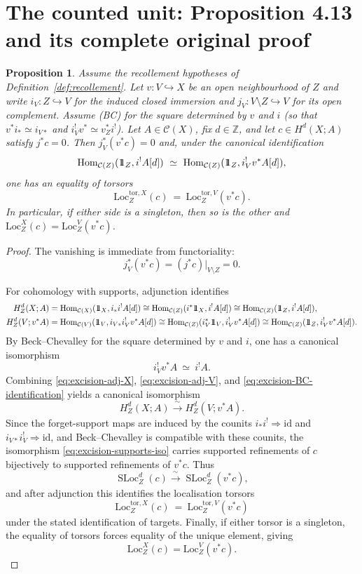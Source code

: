 \documentclass[10pt,a4paper]{amsart}
\newcommand{\C}{\mathcal C}
\newcommand{\Hom}{\mathrm{Hom}}
\newcommand{\Loc}{\mathrm{Loc}}
\newcommand{\SLoc}{\operatorname{SLoc}}
\newcommand{\id}{\mathrm{id}}
\newcommand{\one}{1\hskip-3.5pt1}
\theoremstyle{plain}
\newtheorem{proposition}[theorem]{Proposition}
\theoremstyle{definition}
\theoremstyle{remark}
\begin{document}
\section{The counted unit: Proposition 4.13 and its complete original proof}

\begin{proposition} \label{prop:Loc-excision}
Assume the recollement hypotheses of Definition~\ref{def:recollement}. Let $v:V\hookrightarrow X$ be an open neighbourhood of $Z$ and write
$i_V:Z\hookrightarrow V$ for the induced closed immersion and $j_V:V\setminus Z\hookrightarrow V$ for its open complement.
Assume (BC) for the square determined by $v$ and $i$ (so that $v^*i_*\simeq i_{V*}$ and $i_V^!v^*\simeq v_Z^*i^!$).
Let $A\in\C(X)$, fix $d\in\mathbb Z$, and let $c\in H^d(X;A)$ satisfy $j^*c=0$.
Then $j_V^*(v^*c)=0$ and, under the canonical identification
$$
\Hom_{\C(Z)}(\one_Z,i^!A[d])\ \simeq\ \Hom_{\C(Z)}(\one_Z,i_V^!v^*A[d]),
$$
one has an equality of torsors
$$
\Loc_Z^{\mathrm{tor},X}(c)\ =\ \Loc_Z^{\mathrm{tor},V}(v^*c).
$$
In particular, if either side is a singleton, then so is the other and $\Loc_Z^{X}(c)=\Loc_Z^{V}(v^*c)$.
\end{proposition}

\begin{proof}
The vanishing is immediate from functoriality:
$$
j_V^*(v^*c)= (j^*c)|_{V\setminus Z}=0.
$$

For cohomology with supports, adjunction identifies
\begin{align}
H_Z^d(X;A)
&=\Hom_{\C(X)}(\one_X,i_*i^!A[d])
\cong \Hom_{\C(Z)}(i^*\one_X,i^!A[d])
\cong \Hom_{\C(Z)}(\one_Z,i^!A[d]), \label{eq:excision-adj-X}\\
H_Z^d(V;v^*A)
&=\Hom_{\C(V)}(\one_V,i_{V*}i_V^!v^*A[d])
\cong \Hom_{\C(Z)}(i_V^*\one_V,i_V^!v^*A[d])
\cong \Hom_{\C(Z)}(\one_Z,i_V^!v^*A[d]). \label{eq:excision-adj-V}
\end{align}
By Beck--Chevalley for the square determined by $v$ and $i$, one has a canonical isomorphism
\begin{equation}\label{eq:excision-BC-identification}
i_V^!v^*A\ \simeq\ i^!A.
\end{equation}
Combining \eqref{eq:excision-adj-X}, \eqref{eq:excision-adj-V}, and \eqref{eq:excision-BC-identification} yields a canonical isomorphism
\begin{equation}\label{eq:excision-supports-iso}
H_Z^d(X;A)\xrightarrow{\ \sim\ } H_Z^d(V;v^*A).
\end{equation}
Since the forget-support maps are induced by the counits $i_*i^!\Rightarrow \id$ and $i_{V*}i_V^!\Rightarrow \id$, and Beck--Chevalley is compatible with these counits, the isomorphism \eqref{eq:excision-supports-iso} carries supported refinements of $c$ bijectively to supported refinements of $v^*c$. Thus
$$
\SLoc_Z^d(c)\xrightarrow{\ \sim\ }\SLoc_Z^d(v^*c),
$$
and after adjunction this identifies the localisation torsors
$$
\Loc_Z^{\mathrm{tor},X}(c)
\ =\
\Loc_Z^{\mathrm{tor},V}(v^*c)
$$
under the stated identification of targets.
Finally, if either torsor is a singleton, the equality of torsors forces equality of the unique element, giving
$$
\Loc_Z^{X}(c)=\Loc_Z^{V}(v^*c).
$$
\end{proof}
\end{document}
